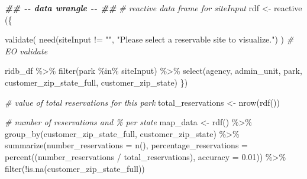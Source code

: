 \documentclass[
  11 pt,
  openany]{book}
\newenvironment{Shaded}{\begin{snugshade}}{\end{snugshade}}
\newcommand{\AttributeTok}[1]{\textcolor[rgb]{0.77,0.63,0.00}{#1}}
\newcommand{\CommentTok}[1]{\textcolor[rgb]{0.56,0.35,0.01}{\textit{#1}}}
\newcommand{\DocumentationTok}[1]{\textcolor[rgb]{0.56,0.35,0.01}{\textbf{\textit{#1}}}}
\newcommand{\FloatTok}[1]{\textcolor[rgb]{0.00,0.00,0.81}{#1}}
\newcommand{\FunctionTok}[1]{\textcolor[rgb]{0.00,0.00,0.00}{#1}}
\newcommand{\NormalTok}[1]{#1}
\newcommand{\OtherTok}[1]{\textcolor[rgb]{0.56,0.35,0.01}{#1}}
\newcommand{\SpecialCharTok}[1]{\textcolor[rgb]{0.00,0.00,0.00}{#1}}
\newcommand{\StringTok}[1]{\textcolor[rgb]{0.31,0.60,0.02}{#1}}
\begin{document}
\begin{Shaded}
\begin{Highlighting}[]
\DocumentationTok{\#\# {-}{-} data wrangle {-}{-} \#\#}
\CommentTok{\# reactive data frame for siteInput}
\NormalTok{rdf }\OtherTok{\textless{}{-}} \FunctionTok{reactive}\NormalTok{ (\{}
  
  \FunctionTok{validate}\NormalTok{(}
    \FunctionTok{need}\NormalTok{(siteInput }\SpecialCharTok{!=} \StringTok{""}\NormalTok{,}
         \StringTok{"Please select a reservable site to visualize."}\NormalTok{)}
\NormalTok{  ) }\CommentTok{\# EO validate}
  
\NormalTok{  ridb\_df }\SpecialCharTok{\%\textgreater{}\%} 
    \FunctionTok{filter}\NormalTok{(park }\SpecialCharTok{\%in\%}\NormalTok{ siteInput) }\SpecialCharTok{\%\textgreater{}\%}
    \FunctionTok{select}\NormalTok{(agency, admin\_unit, park, customer\_zip\_state\_full, }
\NormalTok{           customer\_zip\_state)}
\NormalTok{\})}

\CommentTok{\# value of total reservations for this park}
\NormalTok{total\_reservations }\OtherTok{\textless{}{-}} \FunctionTok{nrow}\NormalTok{(}\FunctionTok{rdf}\NormalTok{())}

\CommentTok{\# number of reservations and \% per state}
\NormalTok{map\_data }\OtherTok{\textless{}{-}} \FunctionTok{rdf}\NormalTok{() }\SpecialCharTok{\%\textgreater{}\%} 
  \FunctionTok{group\_by}\NormalTok{(customer\_zip\_state\_full, customer\_zip\_state) }\SpecialCharTok{\%\textgreater{}\%}
  \FunctionTok{summarize}\NormalTok{(}\AttributeTok{number\_reservations =} \FunctionTok{n}\NormalTok{(),}
            \AttributeTok{percentage\_reservations =} 
              \FunctionTok{percent}\NormalTok{((number\_reservations }\SpecialCharTok{/}\NormalTok{ total\_reservations), }
                                              \AttributeTok{accuracy =} \FloatTok{0.01}\NormalTok{)) }\SpecialCharTok{\%\textgreater{}\%}
  \FunctionTok{filter}\NormalTok{(}\SpecialCharTok{!}\FunctionTok{is.na}\NormalTok{(customer\_zip\_state\_full))}


\end{Highlighting}
\end{Shaded}
\end{document}
